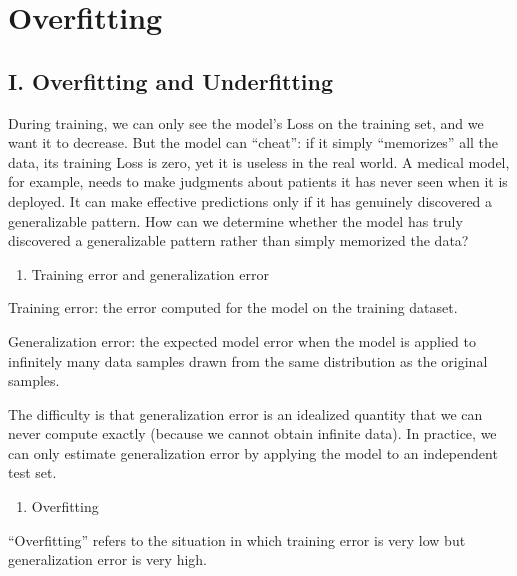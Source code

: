 \setcounter{section}{3}

\hypertarget{overfitting}{%
\section{Overfitting}\label{overfitting}}

\hypertarget{i.-overfitting-and-underfitting}{%
\subsection{I. Overfitting and Underfitting}\label{i.-overfitting-and-underfitting}}

During training, we can only see the model's Loss on the training set, and we want it to decrease. But the model can ``cheat'': if it simply ``memorizes'' all the data, its training Loss is zero, yet it is useless in the real world. A medical model, for example, needs to make judgments about patients it has never seen when it is deployed. It can make effective predictions only if it has genuinely discovered a generalizable pattern. How can we determine whether the model has truly discovered a generalizable pattern rather than simply memorized the data?

\begin{enumerate}
\def\labelenumi{\arabic{enumi}.}
\tightlist
\item
  Training error and generalization error
\end{enumerate}

Training error: the error computed for the model on the training dataset.

Generalization error: the expected model error when the model is applied to infinitely many data samples drawn from the same distribution as the original samples.

The difficulty is that generalization error is an idealized quantity that we can never compute exactly (because we cannot obtain infinite data). In practice, we can only estimate generalization error by applying the model to an independent test set.

\begin{enumerate}
\def\labelenumi{\arabic{enumi}.}
\setcounter{enumi}{1}
\tightlist
\item
  Overfitting
\end{enumerate}

``Overfitting'' refers to the situation in which training error is very low but generalization error is very high.

